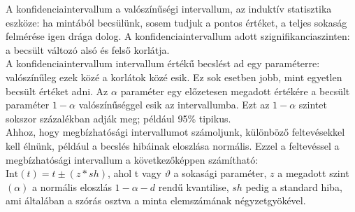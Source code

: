 \documentclass[11pt,a4paper]{article}
\begin{document}
  \begin{tcolorbox}[colback=MidnightBlue!5!white,colframe=MidnightBlue!60!black,title= Konfidencia intervallum]
    A konfidenciaintervallum a valószínűségi intervallum, az induktív statisztika eszköze: ha mintából becsülünk, sosem tudjuk a pontos értéket, a teljes sokaság felmérése igen drága dolog. A konfidenciaintervallum adott szignifikanciaszinten: a becsült változó alsó és felső korlátja.\\
    A konfidenciaintervallum intervallum értékű becslést ad egy paraméterre: valószínűleg ezek közé a korlátok közé esik. Ez sok esetben jobb, mint egyetlen becsült értéket adni. Az $\alpha$ paraméter egy előzetesen megadott értékére a becsült paraméter $1-\alpha$ valószínűséggel esik az intervallumba. Ezt az $1-\alpha$ szintet sokszor százalékban adják meg; például 95\% tipikus.\\
    Ahhoz, hogy megbízhatósági intervallumot számoljunk, különböző feltevésekkel kell élnünk, például a becslés hibáinak eloszlása normális. Ezzel a feltevéssel a megbízhatósági intervallum a következőképpen számítható:\\
    $\text{Int}(t)=t\pm(z*sh)$, ahol t vagy $\vartheta$  a sokasági paraméter, $z$ a megadott szint $(\alpha)$ a normális eloszlás $1-\alpha-d$ rendű kvantilise, $sh$ pedig a standard hiba, ami általában a szórás osztva a minta elemszámának négyzetgyökével.
  \end{tcolorbox}
\end{document}
